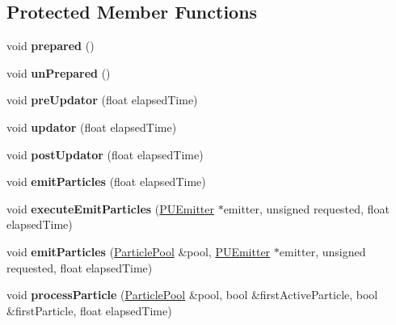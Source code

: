 \subsection*{Protected Member Functions}
\begin{DoxyCompactItemize}
\item 
\mbox{\label{classPUParticleSystem3D_a831cca267d8feefbbf6a1f2bb5148792}} 
void {\bfseries prepared} ()
\item 
\mbox{\label{classPUParticleSystem3D_a90fe96faae7966e36f39756bd4a0d262}} 
void {\bfseries un\+Prepared} ()
\item 
\mbox{\label{classPUParticleSystem3D_aae4c1d47b37f4f6207aa73274cc3acc0}} 
void {\bfseries pre\+Updator} (float elapsed\+Time)
\item 
\mbox{\label{classPUParticleSystem3D_a18cd8401c1fcdf4babeed555b2883d64}} 
void {\bfseries updator} (float elapsed\+Time)
\item 
\mbox{\label{classPUParticleSystem3D_a01037ad5f1d5cc9b5557793ac2a776ac}} 
void {\bfseries post\+Updator} (float elapsed\+Time)
\item 
\mbox{\label{classPUParticleSystem3D_a9d8010d75a50cb5ceab238ba95f7dce6}} 
void {\bfseries emit\+Particles} (float elapsed\+Time)
\item 
\mbox{\label{classPUParticleSystem3D_aaac18cd6cad329331154af1220e56863}} 
void {\bfseries execute\+Emit\+Particles} (\hyperlink{classPUEmitter}{P\+U\+Emitter} $\ast$emitter, unsigned requested, float elapsed\+Time)
\item 
\mbox{\label{classPUParticleSystem3D_a76b10e70bfe82f17057e7a3da5330c28}} 
void {\bfseries emit\+Particles} (\hyperlink{classDataPool}{Particle\+Pool} \&pool, \hyperlink{classPUEmitter}{P\+U\+Emitter} $\ast$emitter, unsigned requested, float elapsed\+Time)
\item 
\mbox{\label{classPUParticleSystem3D_a3578d30c831b28d0c78d8b68c32fc1e0}} 
void {\bfseries process\+Particle} (\hyperlink{classDataPool}{Particle\+Pool} \&pool, bool \&first\+Active\+Particle, bool \&first\+Particle, float elapsed\+Time)

\end{DoxyCompactItemize}
